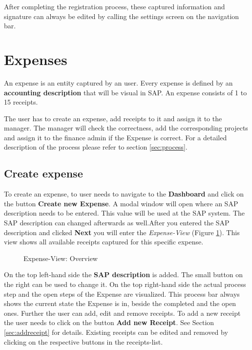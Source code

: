 After completing the registration process, these captured information and signature can always be edited by calling the settings screen on the navigation bar.
\clearpage

\section{Expenses}

An expense is an entity captured by an user. Every expense is defined by an \textbf{accounting description} that will be visual in SAP. An expense consists of 1 to 15 receipts.

The user has to create an expense, add receipts to it and assign it to the manager. The manager will check the correctness, add the corresponding projects and assign it to the finance admin if the Expense is correct. For a detailed description of the process please refer to section \ref{sec:process}. 

\subsection{Create expense}

To create an expense, to user needs to navigate to the \textbf{Dashboard} and click on the button \textbf{Create new Expense}. A modal window will open where an SAP description needs to be entered. This value will be used at the SAP system. The SAP description can changed afterwards as well.\newline After you entered the SAP description and clicked \textbf{Next} you will enter the \textit{Expense-View} (Figure \ref{fig:expensesitems-overview}). This view shows all available receipts captured for this specific expense. 

\begin{figure}[H]
    \centering
    \caption{Expense-View: Overview}
    \label{fig:expensesitems-overview}
\end{figure}

On the top left-hand side the \textbf{SAP description} is added. The small button on the right can be used to change it. On the top right-hand side the actual process step and the open steps of the Expense are visualized. This process bar always shows the current state the Expense is in, beside the completed and the open ones.\newline
Further the user can add, edit and remove receipts. To add a new receipt the user needs to click on the button \textbf{Add new Receipt}. See Section \ref{sec:addreceipt} for details.\newline
Existing receipts can be edited and removed by clicking on the respective buttons in the receipts-list.


